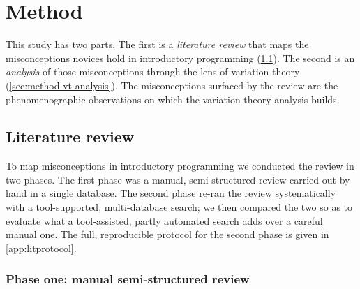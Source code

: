 \mode*
\section{Method}

This study has two parts. The first is a \emph{literature review} that maps the
misconceptions novices hold in introductory programming
(\cref{sec:method-litreview}). The second is an \emph{analysis} of those
misconceptions through the lens of variation theory
(\cref{sec:method-vt-analysis}). The misconceptions surfaced by the review are
the phenomenographic observations on which the variation-theory analysis builds.

\subsection{Literature review}
\label{sec:method-litreview}

To map misconceptions in introductory programming we conducted the review in two
phases. The first phase was a manual, semi-structured review carried out by hand
in a single database. The second phase re-ran the review systematically with a
tool-supported, multi-database search; we then compared the two so as to
evaluate what a tool-assisted, partly automated search adds over a careful
manual one. The full, reproducible protocol for the second phase is given in
\cref{app:litprotocol}.

\subsubsection{Phase one: manual semi-structured review}

